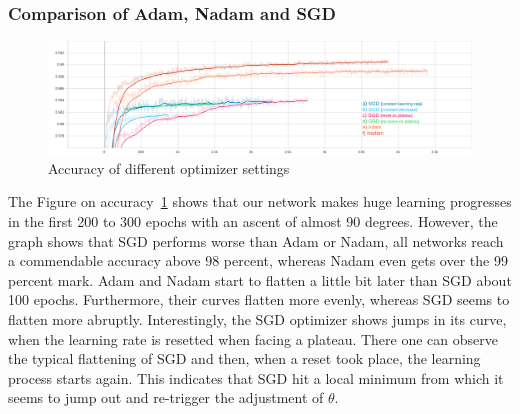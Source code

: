 
%





\subsubsection{Comparison of Adam, Nadam and SGD}
\begin{figure}[H]
    \centering
    \includegraphics[width=\textwidth,height=\textheight,keepaspectratio]{img/accuracy_all.png}
    \decoRule
    \caption[Experiments: Accuracy]{Accuracy of different optimizer settings}
    \label{fig:accuracy}
\end{figure}

The Figure on accuracy~\ref{fig:accuracy} shows that our network makes huge learning progresses in the first
200 to 300 epochs with an ascent of almost 90 degrees.
However, the graph shows that \gls{SGD} performs worse than \gls{Adam} or \gls{Nadam}, all networks reach a commendable accuracy above
98 percent, whereas \gls{Nadam} even gets over the 99 percent mark.
\gls{Adam} and \gls{Nadam} start to flatten a little bit later than \gls{SGD} about 100 epochs.
Furthermore, their curves flatten more evenly, whereas \gls{SGD}
seems to flatten more abruptly.
Interestingly, the \gls{SGD} optimizer shows jumps in its curve, when the learning rate is resetted when facing a plateau.
There one can observe the typical flattening of \gls{SGD} and then, when a reset took place, the learning process starts again.
This indicates that \gls{SGD} hit a local minimum from which it seems to jump out and re-trigger the adjustment of $\theta$.


